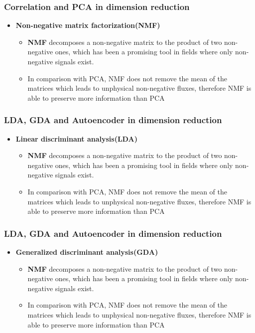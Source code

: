 \documentclass[11pt]{beamer}
\begin{document}
\begin{frame}
\frametitle{Correlation and PCA in dimension reduction}
\begin{itemize}
	\item \textbf{Non-negative matrix factorization(NMF)}
	\begin{itemize}
		\item \textbf{NMF} decomposes a non-negative matrix to the product of two non-negative ones, which has been a promising tool in fields where only non-negative signals exist.
		\item In comparison with PCA, NMF does not remove the mean of the matrices which leads to unphysical non-negative fluxes, therefore NMF is able to preserve more information than PCA
	\end{itemize}
\end{itemize}
\end{frame}

\begin{frame}
\frametitle{LDA, GDA and Autoencoder in dimension reduction}
\begin{itemize}
	\item \textbf{Linear discriminant analysis(LDA)}
	\begin{itemize}
		\item \textbf{NMF} decomposes a non-negative matrix to the product of two non-negative ones, which has been a promising tool in fields where only non-negative signals exist.
		\item In comparison with PCA, NMF does not remove the mean of the matrices which leads to unphysical non-negative fluxes, therefore NMF is able to preserve more information than PCA
	\end{itemize}
\end{itemize}
\end{frame}

\begin{frame}
\frametitle{LDA, GDA and Autoencoder in dimension reduction}
\begin{itemize}
	\item \textbf{Generalized discriminant analysis(GDA)}
	\begin{itemize}
		\item \textbf{NMF} decomposes a non-negative matrix to the product of two non-negative ones, which has been a promising tool in fields where only non-negative signals exist.
		\item In comparison with PCA, NMF does not remove the mean of the matrices which leads to unphysical non-negative fluxes, therefore NMF is able to preserve more information than PCA
	\end{itemize}
\end{itemize}
\end{frame}
\end{document}
